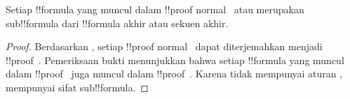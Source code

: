 \documentclass[../../../include/open-logic-section]{subfiles}
\begin{document}
\begin{cor}
Setiap !!{formula} yang muncul dalam !!{proof} normal~ atau
 merupakan sub!!{formula} dari !!{formula} akhir atau sekuen akhir.
\end{cor}

\begin{proof}
  Berdasarkan , setiap !!{proof}
  normal~ dapat diterjemahkan menjadi !!{proof}~.
  Pemeriksaan bukti menunjukkan bahwa setiap !!{formula} yang muncul dalam
  !!{proof}~ juga muncul dalam !!{proof}~. Karena tidak
  mempunyai aturan \Cut{},  mempunyai sifat sub!!{formula}.
\end{proof}
\end{document}
